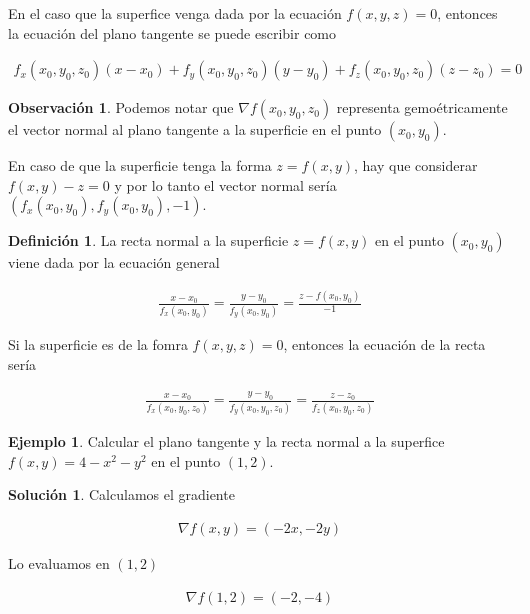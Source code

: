 \documentclass{article}
\theoremstyle{plain}
\theoremstyle{definition}
\newtheorem{defin}[thm]{Definición}
\newtheorem{ejem}[thm]{Ejemplo}
\newtheorem{sol}[thm]{Solución}
\newtheorem{rmk}[thm]{Observación}
\begin{document}
En el caso que la superfice venga dada por la ecuación $f(x,y,z)=0$, entonces la ecuación del plano tangente se puede escribir como

\begin{align*}
    f_x(x_0,y_0,z_0)(x-x_0) +f_y(x_0,y_0,z_0)(y-y_0) +f_z(x_0,y_0,z_0)(z-z_0) =0
\end{align*}

\begin{rmk}Podemos notar que $\nabla f(x_0,y_0,z_0)$ representa gemoétricamente el vector normal al plano tangente a la superficie en el punto $(x_0,y_0)$. \\
\end{rmk}

En caso de que la superficie tenga la forma $z=f(x,y)$, hay que considerar $f(x,y)-z=0$ y por lo tanto el vector normal sería $(f_x(x_0,y_0),f_y(x_0,y_0), -1)$. \\

\begin{defin}La recta normal a la superficie $z=f(x,y)$ en el punto $(x_0,y_0)$ viene dada por la ecuación general
\end{defin}

\begin{align*}
\frac{x-x_0}{f_x(x_0,y_0)} = \frac{y-y_0}{f_y(x_0,y_0)} =\frac{z-f(x_0,y_0)}{-1}
\end{align*}

Si la superficie es de la fomra $f(x,y,z)=0$, entonces la ecuación de la recta sería

\begin{align*}
\frac{x-x_0}{f_x(x_0,y_0,z_0)} = \frac{y-y_0}{f_y(x_0,y_0,z_0)} =\frac{z-z_0}{f_z(x_0,y_0,z_0)}
\end{align*}


\begin{ejem}Calcular el plano tangente y la recta normal a la superfice $f(x,y)=4-x^2-y^2$ en el punto $(1,2)$. \\
\end{ejem}

\begin{sol}Calculamos el gradiente
\end{sol}

\begin{align*}
    \nabla f (x,y)= (-2x,-2y)
\end{align*}

Lo evaluamos en $(1,2)$

\begin{align*}
    \nabla f (1,2)= (-2,-4)
\end{align*}
\end{document}
